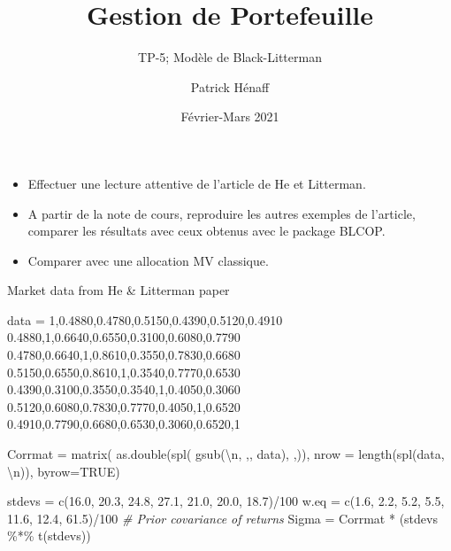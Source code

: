 \documentclass[
]{article}
\title{Gestion de Portefeuille}
\subtitle{TP-5; Modèle de Black-Litterman}
\author{Patrick Hénaff}
\date{Février-Mars 2021}
\newenvironment{Shaded}{\begin{snugshade}}{\end{snugshade}}
\newcommand{\AttributeTok}[1]{\textcolor[rgb]{0.77,0.63,0.00}{#1}}
\newcommand{\CommentTok}[1]{\textcolor[rgb]{0.56,0.35,0.01}{\textit{#1}}}
\newcommand{\ConstantTok}[1]{\textcolor[rgb]{0.00,0.00,0.00}{#1}}
\newcommand{\DecValTok}[1]{\textcolor[rgb]{0.00,0.00,0.81}{#1}}
\newcommand{\FloatTok}[1]{\textcolor[rgb]{0.00,0.00,0.81}{#1}}
\newcommand{\FunctionTok}[1]{\textcolor[rgb]{0.00,0.00,0.00}{#1}}
\newcommand{\NormalTok}[1]{#1}
\newcommand{\OtherTok}[1]{\textcolor[rgb]{0.56,0.35,0.01}{#1}}
\newcommand{\SpecialCharTok}[1]{\textcolor[rgb]{0.00,0.00,0.00}{#1}}
\newcommand{\StringTok}[1]{\textcolor[rgb]{0.31,0.60,0.02}{#1}}
\begin{document}
\maketitle

\begin{itemize}
\item
  Effectuer une lecture attentive de l'article de He et Litterman.
\item
  A partir de la note de cours, reproduire les autres exemples de
  l'article, comparer les résultats avec ceux obtenus avec le package
  BLCOP.
\item
  Comparer avec une allocation MV classique.
\end{itemize}

Market data from He \& Litterman paper

\begin{Shaded}
\begin{Highlighting}[]
\NormalTok{ data }\OtherTok{=}
\StringTok{\textquotesingle{}1,0.4880,0.4780,0.5150,0.4390,0.5120,0.4910}
\StringTok{ 0.4880,1,0.6640,0.6550,0.3100,0.6080,0.7790}
\StringTok{ 0.4780,0.6640,1,0.8610,0.3550,0.7830,0.6680}
\StringTok{ 0.5150,0.6550,0.8610,1,0.3540,0.7770,0.6530}
\StringTok{ 0.4390,0.3100,0.3550,0.3540,1,0.4050,0.3060}
\StringTok{ 0.5120,0.6080,0.7830,0.7770,0.4050,1,0.6520}
\StringTok{ 0.4910,0.7790,0.6680,0.6530,0.3060,0.6520,1\textquotesingle{}}
  
\NormalTok{  Corrmat }\OtherTok{=} \FunctionTok{matrix}\NormalTok{( }\FunctionTok{as.double}\NormalTok{(}\FunctionTok{spl}\NormalTok{( }\FunctionTok{gsub}\NormalTok{(}\StringTok{\textquotesingle{}}\SpecialCharTok{\textbackslash{}n}\StringTok{\textquotesingle{}}\NormalTok{, }\StringTok{\textquotesingle{},\textquotesingle{}}\NormalTok{, data), }\StringTok{\textquotesingle{},\textquotesingle{}}\NormalTok{)), }
                    \AttributeTok{nrow =} \FunctionTok{length}\NormalTok{(}\FunctionTok{spl}\NormalTok{(data, }\StringTok{\textquotesingle{}}\SpecialCharTok{\textbackslash{}n}\StringTok{\textquotesingle{}}\NormalTok{)), }\AttributeTok{byrow=}\ConstantTok{TRUE}\NormalTok{)}
  
\NormalTok{  stdevs }\OtherTok{=} \FunctionTok{c}\NormalTok{(}\FloatTok{16.0}\NormalTok{, }\FloatTok{20.3}\NormalTok{, }\FloatTok{24.8}\NormalTok{, }\FloatTok{27.1}\NormalTok{, }\FloatTok{21.0}\NormalTok{,  }\FloatTok{20.0}\NormalTok{, }\FloatTok{18.7}\NormalTok{)}\SpecialCharTok{/}\DecValTok{100}
\NormalTok{  w.eq }\OtherTok{=} \FunctionTok{c}\NormalTok{(}\FloatTok{1.6}\NormalTok{, }\FloatTok{2.2}\NormalTok{, }\FloatTok{5.2}\NormalTok{, }\FloatTok{5.5}\NormalTok{, }\FloatTok{11.6}\NormalTok{, }\FloatTok{12.4}\NormalTok{, }\FloatTok{61.5}\NormalTok{)}\SpecialCharTok{/}\DecValTok{100}
  \CommentTok{\# Prior covariance of returns}
\NormalTok{  Sigma }\OtherTok{=}\NormalTok{ Corrmat }\SpecialCharTok{*}\NormalTok{ (stdevs }\SpecialCharTok{\%*\%} \FunctionTok{t}\NormalTok{(stdevs))}
\end{Highlighting}
\end{Shaded}
\end{document}
